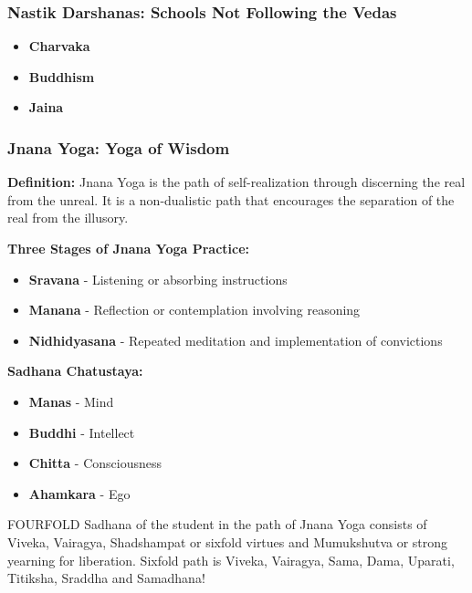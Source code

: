 \begin{frame}[fragile]\frametitle{Nastik Darshanas: Schools Not Following the Vedas}
    \begin{itemize}
        \item \textbf{Charvaka}
        \item \textbf{Buddhism}
        \item \textbf{Jaina}
    \end{itemize}
\end{frame}

\begin{frame}[fragile]\frametitle{Jnana Yoga: Yoga of Wisdom}
    \textbf{Definition:} Jnana Yoga is the path of self-realization through discerning the real from the unreal. It is a non-dualistic path that encourages the separation of the real from the illusory.

    
    \textbf{Three Stages of Jnana Yoga Practice:}
    \begin{itemize}
        \item \textbf{Sravana} - Listening or absorbing instructions
        \item \textbf{Manana} - Reflection or contemplation involving reasoning
        \item \textbf{Nidhidyasana} - Repeated meditation and implementation of convictions
    \end{itemize}

    \textbf{Sadhana Chatustaya:}
    \begin{itemize}
        \item \textbf{Manas} - Mind
        \item \textbf{Buddhi} - Intellect
        \item \textbf{Chitta} - Consciousness
        \item \textbf{Ahamkara} - Ego
    \end{itemize}
	
FOURFOLD Sadhana of the student in the path of Jnana Yoga consists of Viveka, Vairagya, Shadshampat or sixfold virtues and Mumukshutva or strong yearning for liberation. Sixfold path is Viveka, Vairagya, Sama, Dama, Uparati, Titiksha, Sraddha and Samadhana!
	
\end{frame}


